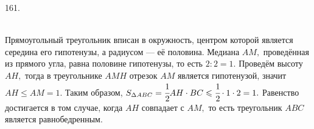 161. \begin{figure}[ht!]
\end{figure}\\
Прямоугольный треугольник вписан в окружность, центром которой является середина его гипотенузы, а радиусом --- её половина. Медиана $AM,$ проведённая из прямого угла, равна половине гипотенузы, то есть $2:2=1.$ Проведём высоту $AH,$ тогда в треугольнике $AMH$ отрезок $AM$ является гипотенузой, значит $AH\leqslant AM=1.$ Таким образом, $S_{\Delta ABC}=\cfrac{1}{2}AH\cdot BC \leqslant \cfrac{1}{2}\cdot 1 \cdot 2=1.$ Равенство достигается в том случае, когда $AH$ совпадает с $AM,$ то есть треугольник $ABC$ является равнобедренным.\newpage\noindent

